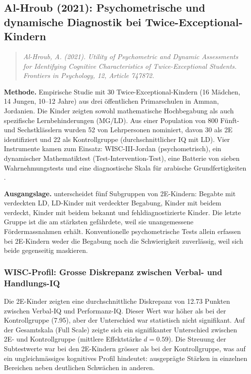 \documentclass[ngerman, a4paper]{article}
\begin{document}
\subsection*{Al-Hroub (2021): Psychometrische und dynamische Diagnostik
  bei Twice-Exceptional-Kindern}
\label{subsec:alhroub2021}

\begin{quote}\itshape
  Al-Hroub, A. (2021). Utility of Psychometric and Dynamic Assessments for
  Identifying Cognitive Characteristics of Twice-Exceptional Students.
  \upshape Frontiers in Psychology, 12, Article 747872.
\end{quote}

\textbf{Methode.} Empirische Studie mit 30 Twice-Exceptional-Kindern (16
Mädchen, 14 Jungen, 10--12 Jahre) aus drei öffentlichen Primarschulen in
Amman, Jordanien. Die Kinder zeigten sowohl mathematische Hochbegabung als
auch spezifische Lernbehinderungen (MG/LD). Aus einer Population von 800
Fünft- und Sechstklässlern wurden 52 von Lehrpersonen nominiert, davon 30
als 2E identifiziert und 22 als Kontrollgruppe (durchschnittlicher IQ mit
LD). Vier Instrumente kamen zum Einsatz: WISC-III-Jordan
(psychometrisch), ein dynamischer Mathematiktest
(Test-Intervention-Test), eine Batterie von sieben Wahrnehmungstests und
eine diagnostische Skala für arabische Grundfertigkeiten
\parencite{alhroub2021utility}.

\textbf{Ausgangslage.} \textcite{alhroub2021utility} unterscheidet fünf Subgruppen von
2E-Kindern: Begabte mit verdeckten LD, LD-Kinder mit verdeckter Begabung,
Kinder mit beidem verdeckt, Kinder mit beidem bekannt und
fehldiagnostizierte Kinder. Die letzte Gruppe ist die am stärksten
gefährdete, weil sie unangemessene Fördermassnahmen erhält. Konventionelle
psychometrische Tests allein erfassen bei 2E-Kindern weder die Begabung
noch die Schwierigkeit zuverlässig, weil sich beide gegenseitig maskieren.

\subsubsection*{WISC-Profil: Grosse Diskrepanz zwischen Verbal- und
  Handlungs-IQ}

Die 2E-Kinder zeigten eine durchschnittliche Diskrepanz von 12.73 Punkten
zwischen Verbal-IQ und Performanz-IQ. Dieser Wert war höher als bei der
Kontrollgruppe (7.95), aber der Unterschied war statistisch nicht
signifikant. Auf der Gesamtskala (Full Scale) zeigte sich ein
signifikanter Unterschied zwischen 2E- und Kontrollgruppe (mittlere
Effektstärke $d = 0.59$). Die Streuung der Subtestwerte war bei den
2E-Kindern grösser als bei der Kontrollgruppe, was auf ein
ungleichmässiges kognitives Profil hindeutet: ausgeprägte Stärken in
einzelnen Bereichen neben deutlichen Schwächen in anderen.
\end{document}
